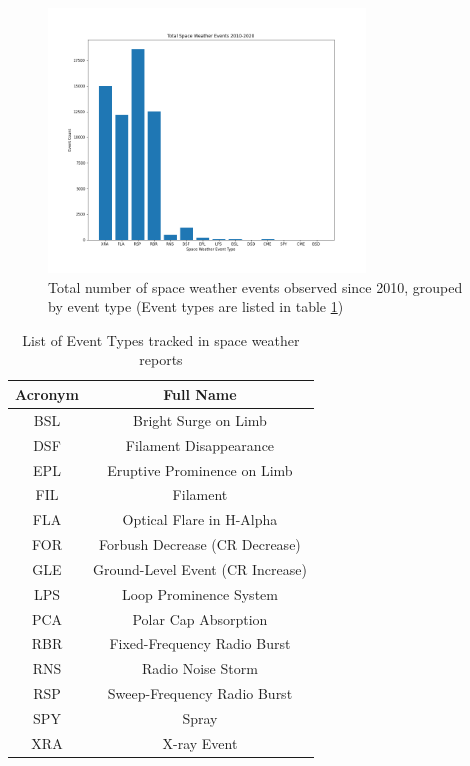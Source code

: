 \documentclass[12pt, letterpaper]{article}
\begin{document}
\begin{figure}[]
    \includegraphics[width=0.75\textwidth]{figures/Space_Weather_Plot.png}
    \centering
    \caption{Total number of space weather events observed since 2010, grouped by event type (Event types are listed in table \ref{space_weather_events})}
    \label{swe_freq}
\end{figure}

\begin{table}[h!]
	\begin{center}
		\begin{tabular}{||c | c ||} 
			\hline
			Acronym & Full Name \\ [0.5ex] 
			\hline\hline
			BSL & Bright Surge on Limb \\
			\hline
			DSF & Filament Disappearance \\ 
			\hline
			EPL & Eruptive Prominence on Limb\\
			\hline
			FIL & Filament\\
			\hline
			FLA & Optical Flare in H-Alpha\\
			\hline
			FOR & Forbush Decrease (CR Decrease) \\
			\hline
			GLE & Ground-Level Event (CR Increase) \\
			\hline
			LPS & Loop Prominence System\\
			\hline
			PCA & Polar Cap Absorption\\
			\hline
			RBR & Fixed-Frequency Radio Burst\\
			\hline
			RNS & Radio Noise Storm\\
			\hline
			RSP & Sweep-Frequency Radio Burst\\
			\hline
			SPY & Spray\\
			\hline
			XRA & X-ray Event \\
			\hline
		\end{tabular}
		\caption{List of Event Types tracked in space weather reports}
		\label{space_weather_events}
	\end{center}
\end{table}
\end{document}

